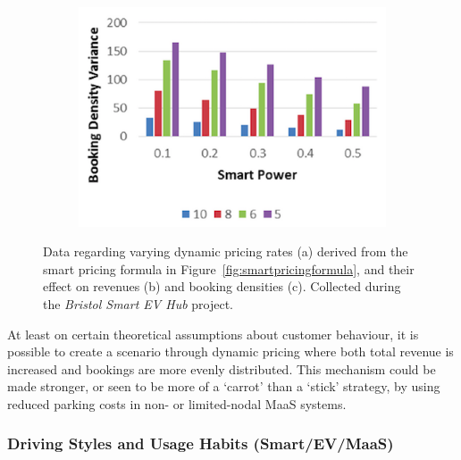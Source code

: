 \documentclass[b5paper,10pt]{article}
\begin{document}
\begin{figure}
\begin{subfigure}[b]{0.6\textwidth}
  \includegraphics[width=\textwidth]{images/smartpricegraph3.png}
        \caption{}
        \label{fig:smartbookingdensities}
\end{subfigure}
\caption{Data regarding varying dynamic pricing rates (a) derived
from the smart pricing formula in
Figure~\ref{fig:smartpricingformula}, and their effect on revenues
(b) and booking densities (c). Collected during the
{\emph{Bristol Smart EV Hub}} project.}
\label{fig:smartpricegraphs}
\end{figure}


At least on certain theoretical assumptions about customer behaviour,
it is possible to create a scenario through dynamic pricing where both
total revenue is increased and bookings are more evenly
distributed. This mechanism could be made stronger, or seen to be more
of a `carrot' than a `stick' strategy, by using reduced parking costs
in non- or limited-nodal MaaS systems.

\subsubsection{Driving Styles and Usage Habits (Smart/EV/MaaS)} 
\end{document}
